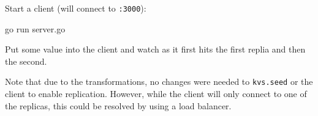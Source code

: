 \documentclass[a5paper,12pt,onecolumn]{article}
\def\code#1{\mbox{\lstinline{#1}}}
\begin{document}
Start a client (will connect to \code{:3000}):

\begin{cli}
go run server.go
\end{cli}

Put some value into the client and watch as it first hits the first replia and then the second.

Note that due to the transformations, no changes were needed to \code{kvs.seed} or the client to enable replication. However, while the client will only connect to one of the replicas, this could be resolved by using a load balancer.
\end{document}
